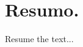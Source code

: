 \documentclass[a4paper,12pt]{article}
\begin{document}
% 

\section{Resumo.}

Resume the text...


\nocite{*}


\end{document}
